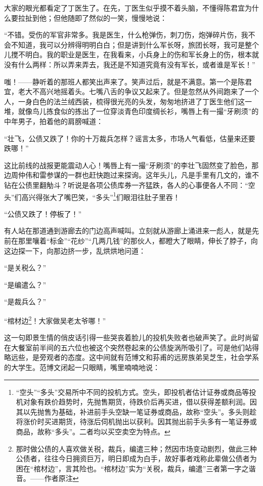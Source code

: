 \par 大家的眼光都看定了丁医生了。在先，丁医生似乎摸不着头脑，不懂得陈君宜为什么要拉扯到他；但他随即了然似的一笑，慢慢地说：
\par “不错。受伤的军官非常多。我是医生，什么枪弹伤，刺刀伤，炮弹碎片伤，我不会不知道，我可以分辨得明明白白；但是讲到什么军长呀，旅团长呀，我可是整个儿搅不明白。我的职业是医生，在我看来，小兵身上的伤和军长身上的伤，根本就没有什么两样：所以弄来弄去，我还是不知道究竟有没有军长，或者谁是军长！”
\par 嗤！——静听着的那班人都笑出声来了。笑声过后，就是不满意。第一个是陈君宜，老大不高兴地摇着头。七嘴八舌的争议又起来了。但是忽然从外间跑来了一个人，一身白色的法兰绒西装，梳得很光亮的头发，匆匆地挤进了丁医生他们这一堆，就像鸟儿拣食似的拣出了一位穿淡青色印度绸长衫，嘴唇上有一撮“牙刷须”的中年男子，拍着他的肩膀喊道：
\par “壮飞，公债又跌了！你的十万裁兵怎样？谣言太多，市场人气看低，估量来还要跌哪！”
\par 这比前线的战报更能震动人心！嘴唇上有一撮“牙刷须”的李壮飞固然变了脸色，那边周仲伟和雷参谋的一群也赶快跑过来探询。这年头儿，凡是手里有几文的，谁不钻在公债里翻觔斗？听说是各项公债库券一齐猛跌，各人的心事便各人不同：“空头”们高兴得张大了嘴巴笑，“多头”\footnote{“空头”“多头”交易所中不同的投机方式。空头，即投机者估计证券或商品等投机对象有跌价趋势时，先抛售期货，待跌价后再买进，借以获得差额利润。因其以先抛售为基础，补进前手头空缺一笔证券或商品，故称“空头”。多头则趁将涨价时买进期货，待涨后伺机抛出以获利。因其抛出前手头多有一笔证券或商品，故称“多头”。二者均以买空卖空为特点。}们眼泪往肚子里吞！
\par “公债又跌了！停板了！”
\par 有人站在那道通到游廊去的门边高声喊叫。立刻就从游廊上涌进来一彪人，就是先前在那里嚷着“标金”“花纱”“几两几钱”的那伙人，都瞪大了眼睛，伸长了脖子，向这边探一下，向那边挤一步，乱烘烘地问道：
\par “是关税么？”
\par “是编遣么？”
\par “是裁兵么？”
\par “棺材边\footnote{那时做公债的人喜欢做关税，裁兵，编遣三种；然因市场变动剧烈，做此三种公债者，往往今日拥资巨万，明日即成为白手，故好事者戏称此辈做公债者为困在“棺材边”，言其险也。“棺材边”实为“关税，裁兵，编遣”三者第一字之谐音。——作者原注}！大家做吴老太爷哪！”
\par 这一句即景生情的俏皮话引得一些哭丧着脸儿的投机失败者也破声笑了。此时尚留在大餐室前半间的五六位也被这个突然卷起来的公债旋涡所吸引了。可是他们站得略远些，是旁观者的态度。这中间就有范博文和荪甫的远房族弟吴芝生，社会学系的大学生。范博文闭起一只眼睛，嘴里喃喃地说：
